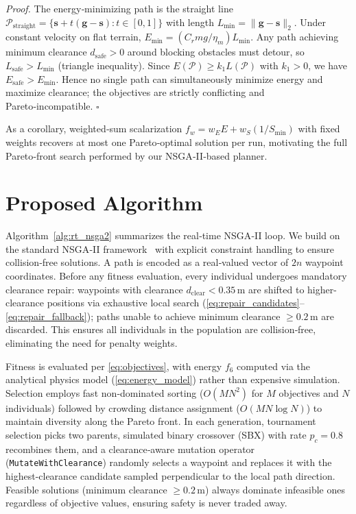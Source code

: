 \documentclass[lettersize,journal]{IEEEtran}
\begin{document}
\textit{Proof.} The energy‑minimizing path is the straight line
$\mathcal{P}_{\mathrm{straight}} = \{\mathbf{s}+t(\mathbf{g}-\mathbf{s}): t\in[0,1]\}$
with length $L_{\min}=\|\mathbf{g}-\mathbf{s}\|_2$. Under constant velocity on
flat terrain, $E_{\min} = (C_r mg/\eta_m) L_{\min}$. Any path achieving
minimum clearance $d_{\mathrm{safe}}>0$ around blocking obstacles must detour,
so $L_{\mathrm{safe}} > L_{\min}$ (triangle inequality). Since
$E(\mathcal{P}) \ge k_1 L(\mathcal{P})$ with $k_1>0$, we have
$E_{\mathrm{safe}} > E_{\min}$. Hence no single path can simultaneously
minimize energy and maximize clearance; the objectives are strictly conflicting
and Pareto‑incompatible. $\square$

As a corollary, weighted‑sum scalarization $f_w = w_E E + w_S(1/S_{\min})$ with
fixed weights recovers at most one Pareto‑optimal solution per run, motivating
the full Pareto‑front search performed by our NSGA‑II‑based planner.

\section{Proposed Algorithm}
\label{sec:algorithm}

Algorithm~\ref{alg:rt_nsga2} summarizes the real‑time NSGA‑II loop. We build on
the standard NSGA‑II framework~\cite{Deb2002} with explicit constraint handling
to ensure collision‑free solutions. A path is encoded as a real‑valued vector of
$2n$ waypoint coordinates. Before any fitness evaluation, every individual
undergoes mandatory clearance repair: waypoints with clearance
$d_{\mathrm{clear}} < 0.35$\,m are shifted to higher-clearance positions via
exhaustive local search (\eqref{eq:repair_candidates}--\eqref{eq:repair_fallback});
paths unable to achieve minimum clearance $\geq 0.2$\,m are discarded. This
ensures all individuals in the population are collision‑free, eliminating the
need for penalty weights.

Fitness is evaluated per \eqref{eq:objectives}, with energy $f_6$ computed via
the analytical physics model (\eqref{eq:energy_model}) rather than expensive
simulation. Selection employs fast non‑dominated sorting ($O(MN^2)$ for $M$
objectives and $N$ individuals) followed by crowding distance assignment
($O(MN\log N)$) to maintain diversity along the Pareto front. In each generation,
tournament selection picks two parents, simulated binary crossover (SBX) with rate
$p_c=0.8$ recombines them, and a clearance‑aware mutation operator
(\texttt{MutateWithClearance}) randomly selects a waypoint and replaces it with
the highest-clearance candidate sampled perpendicular to the local path direction.
Feasible solutions (minimum clearance $\geq 0.2$\,m) always dominate infeasible
ones regardless of objective values, ensuring safety is never traded away.
\end{document}
